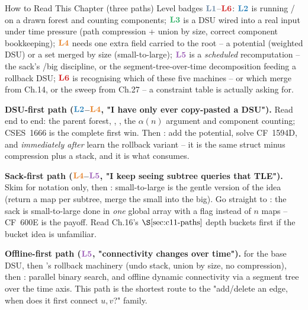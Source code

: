 \begin{chaptertheorybox}{How to Read This Chapter (three paths)}
Level badges \(\lv1\)--\(\lv6\): \(\lv2\) is running /
on a drawn forest and counting components; \(\lv3\) is a DSU wired into a real
input under time pressure (path compression + union by size, correct
component bookkeeping); \(\lv4\) needs one extra field carried to the root --
a potential (weighted DSU) or a set merged by size (small-to-large); \(\lv5\)
is a \emph{scheduled} recomputation -- the sack's /big discipline,
or the segment-tree-over-time decomposition feeding a rollback DSU; \(\lv6\)
is recognising which of these five machines -- or which merge from Ch.14, or
the sweep from Ch.27 -- a constraint table is actually asking for.

\textbf{DSU-first path (\(\lv2\)--\(\lv4\), "I have only ever copy-pasted a
DSU").}  Read  end to end: the parent forest, ,
, the \(\alpha(n)\) argument and component counting; CSES~1666 is
the complete first win.  Then : add the potential, solve
CF~1594D, and \emph{immediately after} learn the rollback variant -- it is the
same struct minus compression plus a stack, and it is what 
consumes.

\textbf{Sack-first path (\(\lv4\)--\(\lv5\), "I keep seeing subtree queries
that TLE").}  Skim  for notation only, then :
small-to-large is the gentle version of the idea (return a map per subtree,
merge the small into the big).  Go straight to : the sack is
small-to-large done in \emph{one} global array with a  flag instead
of \(n\) maps -- CF~600E is the payoff.  Read Ch.16's \(\secref{c11-paths}\)
depth buckets first if the bucket idea is unfamiliar.

\textbf{Offline-first path (\(\lv5\), "connectivity changes over time").}
 for the base DSU, then 's rollback
machinery (undo stack, union by size, no compression), then
: parallel binary search, and offline dynamic connectivity
via a segment tree over the time axis.  This path is the shortest route to the
"add/delete an edge, when does it first connect \(u,v\)?" family.
\end{chaptertheorybox}

